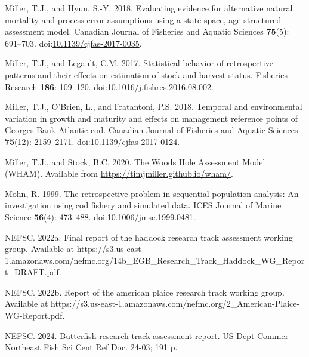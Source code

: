 \documentclass[
  12pt,
]{article}
\newlength{\cslhangindent}
\newlength{\cslentryspacingunit} %
\newenvironment{CSLReferences}[2] %
 {%
  \setlength{\parindent}{0pt}
  \ifodd #1
  \let\oldpar\par
  \def\par{\hangindent=\cslhangindent\oldpar}
  \fi
  \setlength{\parskip}{#2\cslentryspacingunit}
 }%
 {}
\begin{document}
\begin{CSLReferences}{1}{0}
\leavevmode{}%
Miller, T.J., and Hyun, S.-Y. 2018. Evaluating evidence for alternative
natural mortality and process error assumptions using a state-space,
age-structured assessment model. Canadian Journal of Fisheries and
Aquatic Sciences \textbf{75}(5): 691--703.
doi:\href{https://doi.org/10.1139/cjfas-2017-0035}{10.1139/cjfas-2017-0035}.

\leavevmode{}%
Miller, T.J., and Legault, C.M. 2017. Statistical behavior of
retrospective patterns and their effects on estimation of stock and
harvest status. Fisheries Research \textbf{186}: 109--120.
doi:\href{https://doi.org/10.1016/j.fishres.2016.08.002}{10.1016/j.fishres.2016.08.002}.

\leavevmode{}%
Miller, T.J., O'Brien, L., and Fratantoni, P.S. 2018. Temporal and
environmental variation in growth and maturity and effects on management
reference points of {G}eorges {B}ank {A}tlantic cod. Canadian Journal of
Fisheries and Aquatic Sciences \textbf{75}(12): 2159--2171.
doi:\href{https://doi.org/10.1139/cjfas-2017-0124}{10.1139/cjfas-2017-0124}.

\leavevmode{}%
Miller, T.J., and Stock, B.C. 2020. The {Woods Hole Assessment Model}
({WHAM}). Available from \url{https://timjmiller.github.io/wham/}.

\leavevmode{}%
Mohn, R. 1999. The retrospective problem in sequential population
analysis: An investigation using cod fishery and simulated data. ICES
Journal of Marine Science \textbf{56}(4): 473--488.
doi:\href{https://doi.org/10.1006/jmsc.1999.0481}{10.1006/jmsc.1999.0481}.

\leavevmode{}%
NEFSC. 2022a. Final report of the haddock research track assessment
working group. {Available} at
https://s3.us-east-1.amazonaws.com/nefmc.org/14b\_EGB\_Research\_Track\_Haddock\_WG\_Report\_DRAFT.pdf.

\leavevmode{}%
NEFSC. 2022b. Report of the american plaice research track working
group. {Available} at
https://s3.us-east-1.amazonaws.com/nefmc.org/2\_American-Plaice-WG-Report.pdf.

\leavevmode{}%
NEFSC. 2024. Butterfish research track assessment report. US Dept Commer
Northeast Fish Sci Cent Ref Doc. 24-03; 191 p.


\end{CSLReferences}
\end{document}
